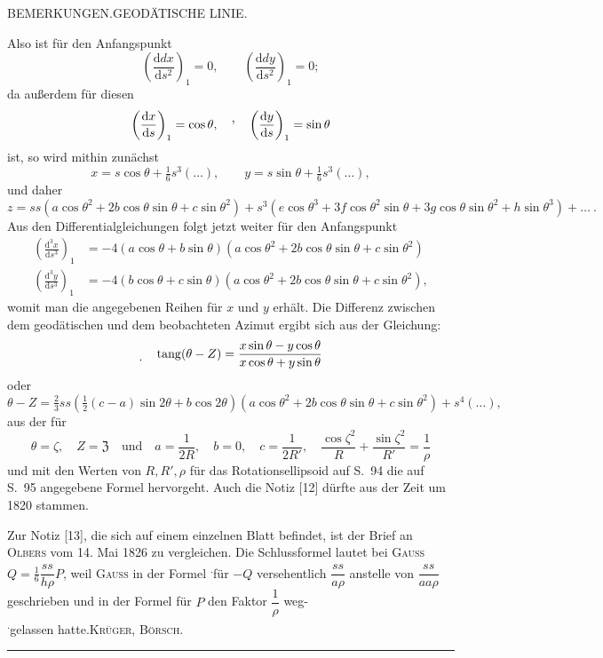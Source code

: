 \clearpage
{}\hfill BEMERKUNGEN.\quad GEODÄTISCHE LINIE.\hfill\mbox{}\par
{\small
\noindent Also ist für den Anfangspunkt
\[
\left(\frac{\mathrm ddx}{\mathrm ds^2}\right)_1=0,\qquad\left(\frac{\mathrm ddy}{\mathrm ds^2}\right)_1=0;
\]
da außerdem für diesen
\[
\left(\frac{\mathrm dx}{\mathrm ds}\right)_1=\cos\theta,\quad\text{\raisebox{1.2ex}{,}}\quad\left(\frac{\mathrm dy}{\mathrm ds}\right)_1=\sin\theta
\]
ist, so wird mithin zunächst
\[
x=s\cos\theta+\tfrac16s^3(\ldots),\qquad y=s\sin\theta+\tfrac16s^3(\ldots),
\]
und daher
\[
z=ss(a\cos\theta^2+2b\cos\theta\sin\theta+c\sin\theta^2)+s^3(e\cos\theta^3+3f\cos\theta^2\sin\theta+3g\cos\theta\sin\theta^2+h\sin\theta^3)+\ldots\ .
\]
Aus den Differentialgleichungen folgt jetzt weiter für den Anfangspunkt
\[
\begin{aligned}
\left(\frac{\mathrm d^3x}{\mathrm ds^3}\right)_1&=-4(a\cos\theta+b\sin\theta)(a\cos\theta^2+2b\cos\theta\sin\theta+c\sin\theta^2)\\
\left(\frac{\mathrm d^3y}{\mathrm ds^3}\right)_1&=-4(b\cos\theta+c\sin\theta)(a\cos\theta^2+2b\cos\theta\sin\theta+c\sin\theta^2),
\end{aligned}
\]
womit man die angegebenen Reihen für $x$ und $y$ erhält. Die Differenz zwischen dem geodätischen und dem beobachteten Azimut ergibt sich aus der Gleichung:
\[
\text{\raisebox{-.6ex}{.}}\quad\operatorname{tang}(\theta-Z)=\frac{x\sin\theta-y\cos\theta}{x\cos\theta+y\sin\theta}
\]
oder
\[
\theta-Z=\tfrac23ss(\tfrac12(c-a)\sin2\theta+b\cos2\theta)(a\cos\theta^2+2b\cos\theta\sin\theta+c\sin\theta^2)+s^4(\ldots),
\]
aus der für
\[
\theta=\zeta,\quad Z=\mathfrak Z\quad\text{und}\quad a=\frac1{2R},\quad b=0,\quad c=\frac1{2R'},\quad\frac{\cos\zeta^2}{R}+\frac{\sin\zeta^2}{R'}=\frac1\rho
\]
und mit den Werten von $R,R',\rho$ für das Rotationsellipsoid auf S.\ 94 die auf S.\ 95 angegebene Formel hervorgeht. Auch die Notiz [12] dürfte aus der Zeit um 1820 stammen.

Zur Notiz [13], die sich auf einem einzelnen Blatt befindet, ist der Brief an \textsc{Olbers} vom 14. Mai 1826 zu vergleichen. Die Schlussformel lautet bei \textsc{Gauss} $Q=\tfrac16\dfrac{ss}{h\rho}P$, weil \textsc{Gauss} in der Formel \textsuperscript{.}für $-Q$ versehentlich $\dfrac{ss}{a\rho}$ anstelle von $\dfrac{ss}{aa\rho}$ geschrieben und in der Formel für $P$ den Faktor $\dfrac1\rho$ weg-\\
\textsuperscript{.}gelassen hatte.\hfill\textsc{Krüger, Börsch.}\par
}
\begin{center}\rule{.24\textwidth}{.4pt}\end{center}

